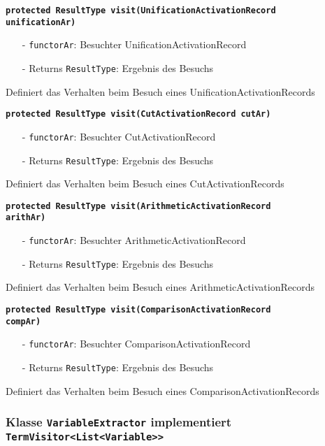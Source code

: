\documentclass[parskip=full,11pt,twoside]{scrartcl}
\begin{document}
\textbf{\texttt{protected ResultType visit(UnificationActivationRecord\\unificationAr)}}
\begin{itemize}[noitemsep]
	\item[-] \texttt{functorAr}: Besuchter UnificationActivationRecord
	\item[-] Returns \texttt{ResultType}: Ergebnis des Besuchs
\end{itemize}
Definiert das Verhalten beim Besuch eines UnificationActivationRecords

\textbf{\texttt{protected ResultType visit(CutActivationRecord cutAr)}}
\begin{itemize}[noitemsep]
	\item[-] \texttt{functorAr}: Besuchter CutActivationRecord
	\item[-] Returns \texttt{ResultType}: Ergebnis des Besuchs
\end{itemize}
Definiert das Verhalten beim Besuch eines CutActivationRecords

\textbf{\texttt{protected ResultType visit(ArithmeticActivationRecord\\arithAr)}}
\begin{itemize}[noitemsep]
	\item[-] \texttt{functorAr}: Besuchter ArithmeticActivationRecord
	\item[-] Returns \texttt{ResultType}: Ergebnis des Besuchs
\end{itemize}
Definiert das Verhalten beim Besuch eines ArithmeticActivationRecords

\textbf{\texttt{protected ResultType visit(ComparisonActivationRecord\\compAr)}}
\begin{itemize}[noitemsep]
	\item[-] \texttt{functorAr}: Besuchter ComparisonActivationRecord
	\item[-] Returns \texttt{ResultType}: Ergebnis des Besuchs
\end{itemize}
Definiert das Verhalten beim Besuch eines ComparisonActivationRecords

\subsubsection{Klasse \texttt{VariableExtractor} implementiert \texttt{TermVisitor<List<Variable>{}>}}
\end{document}
